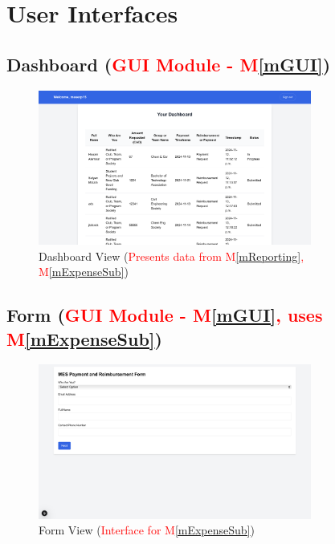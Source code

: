 \documentclass[12pt, titlepage]{article}
\newcommand{\mref}[1]{M\ref{#1}}
\begin{document}
\section{User Interfaces}

\subsection{Dashboard (\textcolor{red}{GUI Module - \mref{mGUI}})}
\begin{figure}[H]
    \centering
    \includegraphics[width=0.8\textwidth]{img/dashboard.png}
    \caption{Dashboard View (\textcolor{red}{Presents data from \mref{mReporting}, \mref{mExpenseSub}})}
    \label{fig:dashboard}
\end{figure}

\subsection{Form (\textcolor{red}{GUI Module - \mref{mGUI}, uses \mref{mExpenseSub}})}
\begin{figure}[H]
    \centering
    \includegraphics[width=0.8\textwidth]{img/form.png}
    \caption{Form View (\textcolor{red}{Interface for \mref{mExpenseSub}})}
    \label{fig:form}
\end{figure}
\end{document}
